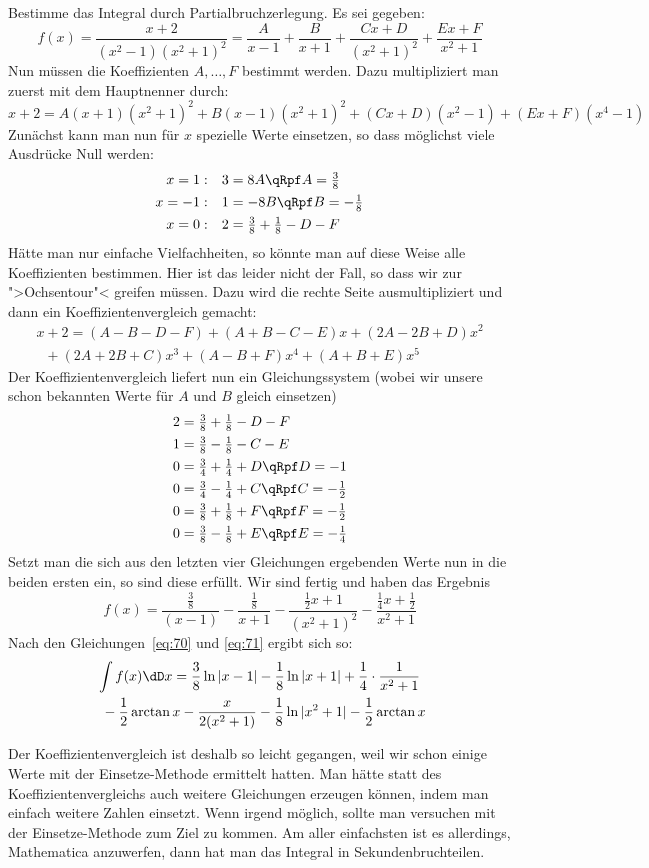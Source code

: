 \NA Bestimme das Integral durch Partialbruchzerlegung.
Es sei gegeben:
\[
f(x)=\frac{x+2}{(x^2-1)(x^2+1)^2}=\frac{A}{x-1}+\frac{B}{x+1}+
\frac{Cx+D}{(x^2+1)^2}+\frac{Ex+F}{x^2+1}
\]
Nun müssen die Koeffizienten $A,\dots,F$ bestimmt werden. Dazu multipliziert
man zuerst mit dem Hauptnenner durch:
\[
x+2=A(x+1)(x^2+1)^2+B(x-1)(x^2+1)^2+(Cx+D)(x^2-1)+(Ex+F)(x^4-1)
\]
Zunächst kann man nun für $x$ spezielle Werte einsetzen, so dass möglichst
viele Ausdrücke Null werden:
\begin{align*}
  x=1: &&& 3=8A \qRpf A=\tfrac{3}{8}\\
  x=-1:&&& 1=-8B \qRpf B=-\tfrac{1}{8}\\
  x=0: &&& 2=\tfrac38+\tfrac18-D-F
\end{align*}
Hätte man nur einfache Vielfachheiten, so könnte man auf diese Weise alle
Koeffizienten bestimmen. Hier ist das leider nicht der Fall, so dass wir zur
">Ochsentour"< greifen müssen. Dazu wird die rechte Seite ausmultipliziert und
dann ein Koeffizientenvergleich gemacht:
\begin{gather*}
  x+2=(A-B-D-F)+(A+B-C-E)x+(2A-2B+D)x^2\\
  \phantom{x}+(2A+2B+C)x^3+(A-B+F)x^4+(A+B+E)x^5
\end{gather*}
Der Koeffizientenvergleich liefert nun ein Gleichungssystem (wobei wir unsere
schon bekannten Werte für $A$ und $B$ gleich einsetzen)
\begin{align*}
  2&=\tfrac{3}{8}+\tfrac{1}{8}-D-F\\
  1&=\tfrac{3}{8}-\tfrac{1}{8}-C-E\\
  0&=\tfrac{3}{4}+\tfrac{1}{4}+D\qRpf D=-1\\
  0&=\tfrac{3}{4}-\tfrac{1}{4}+C\qRpf C=-\tfrac{1}{2}\\
  0&=\tfrac{3}{8}+\tfrac{1}{8}+F\qRpf F=-\tfrac{1}{2}\\
  0&=\tfrac{3}{8}-\tfrac{1}{8}+E\qRpf E=-\tfrac{1}{4}
\end{align*}
Setzt man die sich aus den letzten vier Gleichungen ergebenden Werte nun in die
beiden ersten ein, so sind diese erfüllt. Wir sind fertig und haben das
Ergebnis
\[
f(x)=\frac{\frac38}{(x-1)}-\frac{\frac18}{x+1}-\frac{\frac12x+1}{(x^2+1)^2}
-\frac{\frac14x+\frac12}{x^2+1}
\]
Nach den Gleichungen~\eqref{eq:70} und \eqref{eq:71} ergibt sich so:
\begin{gather*}
\int f(x)\dD x=\frac{3}{8}\ln|x-1|-\frac18\ln|x+1|+\frac14\cdot\frac{1}{x^2+1}\\
\phantom{x}-\frac12\arctan x-\frac{x}{2(x^2+1)}-\frac{1}{8}\ln|x^2+1|
-\frac12\arctan x
\end{gather*}

Der Koeffizientenvergleich ist deshalb so leicht gegangen, weil wir schon
einige Werte mit der Einsetze-Methode ermittelt hatten. Man hätte statt des
Koeffizientenvergleichs auch weitere Gleichungen erzeugen können, indem man
einfach weitere Zahlen einsetzt. Wenn irgend möglich, sollte man versuchen mit
der Einsetze-Methode zum Ziel zu kommen. Am aller einfachsten ist es
allerdings, Mathematica anzuwerfen, dann hat man das Integral in
Sekundenbruchteilen.
